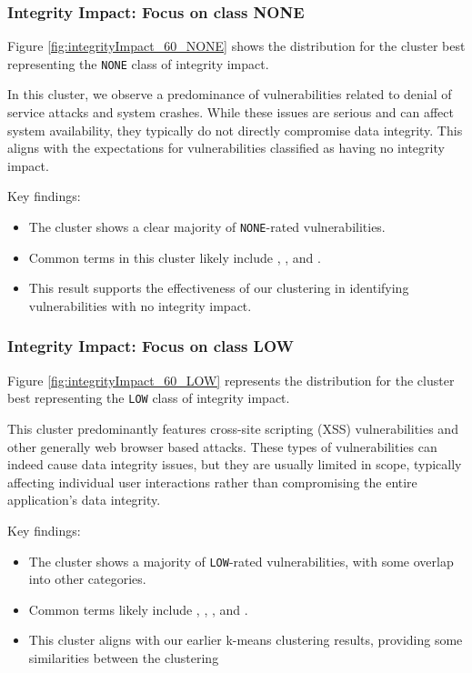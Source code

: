 \documentclass[12pt]{article}
\begin{document}
\subsubsection{Integrity Impact: Focus on class NONE}

Figure \ref{fig:integrityImpact_60_NONE} shows the distribution for the cluster best representing
the \texttt{NONE} class of integrity impact.


In this cluster, we observe a predominance of vulnerabilities related to denial of service attacks
and system crashes. While these issues are serious and can affect system availability, they
typically do not directly compromise data integrity. This aligns with the expectations for
vulnerabilities classified as having no integrity impact.

Key findings:
\begin{itemize}

	\item The cluster shows a clear majority of \texttt{NONE}-rated vulnerabilities.

	\item Common terms in this cluster likely include , , and
	      .

	\item This result supports the effectiveness of our clustering in identifying vulnerabilities
	      with no integrity impact.

\end{itemize}

\subsubsection{Integrity Impact: Focus on class LOW}

Figure \ref{fig:integrityImpact_60_LOW} represents the distribution for the cluster best
representing the \texttt{LOW} class of integrity impact.

This cluster predominantly features cross-site scripting (XSS) vulnerabilities and other generally
web browser based attacks. These types of vulnerabilities can indeed cause data integrity issues, but
they are usually limited in scope, typically affecting individual user interactions rather than
compromising the entire application's data integrity.

Key findings:
\begin{itemize}

	\item The cluster shows a majority of \texttt{LOW}-rated vulnerabilities, with some overlap into
	      other categories.

	\item Common terms likely include , , , and .

	\item This cluster aligns with our earlier k-means clustering results, providing some
	      similarities between the clustering
\end{itemize}
\end{document}
